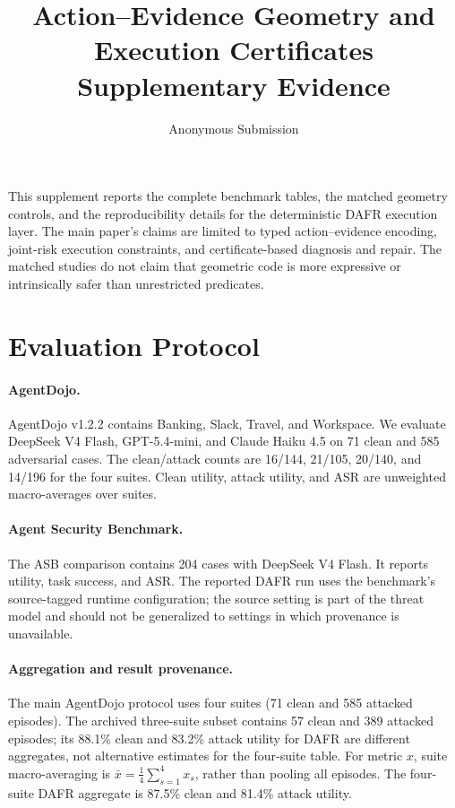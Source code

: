 \documentclass[11pt]{article}
\title{Action--Evidence Geometry and Execution Certificates\\Supplementary Evidence}
\author{Anonymous Submission}
\begin{document}
\appendix
\maketitle

This supplement reports the complete benchmark tables, the matched geometry controls, and the reproducibility details for the deterministic DAFR execution layer. The main paper's claims are limited to typed action--evidence encoding, joint-risk execution constraints, and certificate-based diagnosis and repair. The matched studies do not claim that geometric code is more expressive or intrinsically safer than unrestricted predicates.

\section{Evaluation Protocol}

\paragraph{AgentDojo.}
AgentDojo v1.2.2 contains Banking, Slack, Travel, and Workspace. We evaluate DeepSeek V4 Flash, GPT-5.4-mini, and Claude Haiku 4.5 on 71 clean and 585 adversarial cases. The clean/attack counts are 16/144, 21/105, 20/140, and 14/196 for the four suites. Clean utility, attack utility, and ASR are unweighted macro-averages over suites.

\paragraph{Agent Security Benchmark.}
The ASB comparison contains 204 cases with DeepSeek V4 Flash. It reports utility, task success, and ASR. The reported DAFR run uses the benchmark's source-tagged runtime configuration; the source setting is part of the threat model and should not be generalized to settings in which provenance is unavailable.

\paragraph{Aggregation and result provenance.}
The main AgentDojo protocol uses four suites (71 clean and 585 attacked episodes). The archived three-suite subset contains 57 clean and 389 attacked episodes; its 88.1\% clean and 83.2\% attack utility for DAFR are different aggregates, not alternative estimates for the four-suite table. For metric $x$, suite macro-averaging is $\bar{x}=\frac{1}{4}\sum_{s=1}^{4}x_s$, rather than pooling all episodes. The four-suite DAFR aggregate is 87.5\% clean and 81.4\% attack utility.
\end{document}
